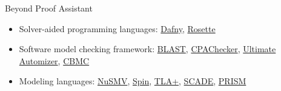 \documentclass[usenames,xcolor=svgnames,11pt,sans,aspectratio=169]{beamer}
\begin{document}
\begin{frame}{Beyond Proof Assistant}
  \begin{itemize}
    \item Solver-aided programming languages:
    \href{https://www.rise4fun.com/Dafny}{Dafny},
    \href{https://emina.github.io/rosette/}{Rosette}
    \item Software model checking framework: 
    \href{http://goto.ucsd.edu/~rjhala/blast.html}{BLAST},
    \href{https://cpachecker.sosy-lab.org}{CPAChecker},
    \href{https://monteverdi.informatik.uni-freiburg.de/tomcat/Website/?ui=tool&tool=automizer}{Ultimate Automizer},
    \href{https://www.cprover.org/cbmc/}{CBMC}
    \item Modeling languages:
    \href{http://nusmv.fbk.eu}{NuSMV},
    \href{http://spinroot.com/spin/whatispin.html}{Spin},
    \href{https://lamport.azurewebsites.net/tla/tla.html}{TLA+},
    \href{https://www.ansys.com/products/embedded-software/ansys-scade-test}{SCADE},
    \href{https://www.prismmodelchecker.org}{PRISM}
  \end{itemize}
\end{frame}
\end{document}
